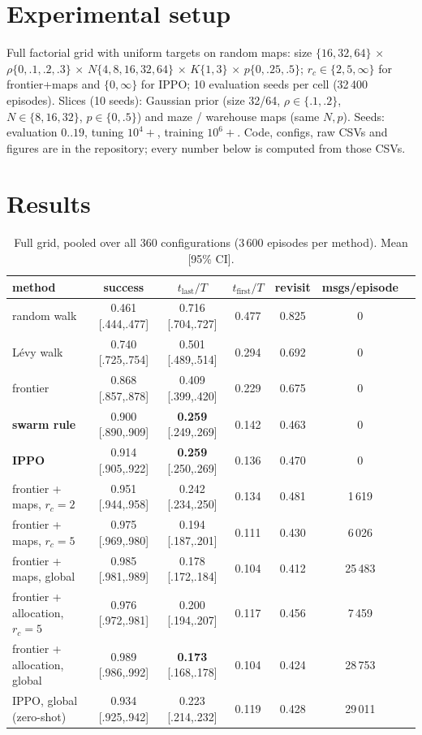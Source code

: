 \documentclass[10pt]{article}
\begin{document}
\section{Experimental setup}
Full factorial grid with uniform targets on random maps: size $\{16,32,64\}$ $\times$ $\rho\{0,.1,.2,.3\}$ $\times$
$N\{4,8,16,32,64\}$ $\times$ $K\{1,3\}$ $\times$ $p\{0,.25,.5\}$; $r_c\in\{2,5,\infty\}$ for frontier+maps and
$\{0,\infty\}$ for IPPO; 10 evaluation seeds per cell (32\,400 episodes). Slices (10 seeds): Gaussian prior
(size 32/64, $\rho\in\{.1,.2\}$, $N\in\{8,16,32\}$, $p\in\{0,.5\}$) and maze / warehouse maps (same $N,p$).
Seeds: evaluation $0..19$, tuning $10^4+$, training $10^6+$. Code, configs, raw CSVs and figures are in the repository;
every number below is computed from those CSVs.

\section{Results}
\begin{table}[t]
\centering\small
\caption{Full grid, pooled over all 360 configurations (3\,600 episodes per method). Mean [95\% CI].}
\label{tab:leader}
\begin{tabular}{lcccccr}
\toprule
method & success & $t_{\text{last}}/T$ & $t_{\text{first}}/T$ & revisit & msgs/episode \\
\midrule
random walk & 0.461 [.444,.477] & 0.716 [.704,.727] & 0.477 & 0.825 & 0 \\
L\'evy walk & 0.740 [.725,.754] & 0.501 [.489,.514] & 0.294 & 0.692 & 0 \\
frontier & 0.868 [.857,.878] & 0.409 [.399,.420] & 0.229 & 0.675 & 0 \\
\textbf{swarm rule} & 0.900 [.890,.909] & \textbf{0.259} [.249,.269] & 0.142 & 0.463 & 0 \\
\textbf{IPPO} & 0.914 [.905,.922] & \textbf{0.259} [.250,.269] & 0.136 & 0.470 & 0 \\
\midrule
frontier + maps, $r_c=2$ & 0.951 [.944,.958] & 0.242 [.234,.250] & 0.134 & 0.481 & 1\,619 \\
frontier + maps, $r_c=5$ & 0.975 [.969,.980] & 0.194 [.187,.201] & 0.111 & 0.430 & 6\,026 \\
frontier + maps, global & 0.985 [.981,.989] & 0.178 [.172,.184] & 0.104 & 0.412 & 25\,483 \\
frontier + allocation, $r_c=5$ & 0.976 [.972,.981] & 0.200 [.194,.207] & 0.117 & 0.456 & 7\,459 \\
frontier + allocation, global & 0.989 [.986,.992] & \textbf{0.173} [.168,.178] & 0.104 & 0.424 & 28\,753 \\
IPPO, global (zero-shot) & 0.934 [.925,.942] & 0.223 [.214,.232] & 0.119 & 0.428 & 29\,011 \\
\bottomrule
\end{tabular}
\end{table}
\end{document}

